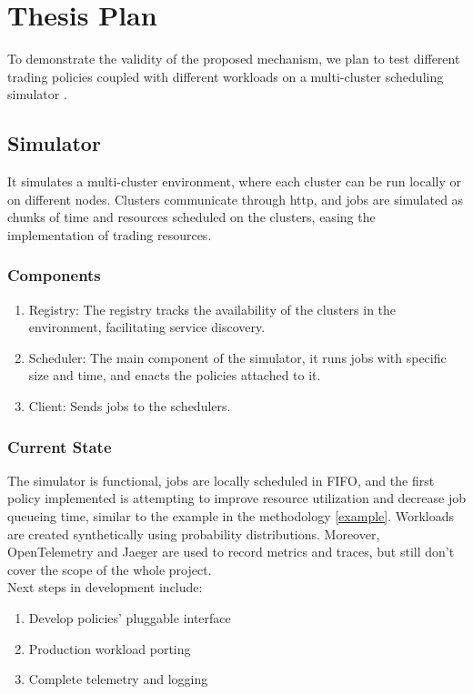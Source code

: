\section{Thesis Plan}

To demonstrate the validity of the proposed mechanism, we plan to test different trading policies 
coupled with different workloads on a multi-cluster scheduling simulator \cite{sched-github}.

\subsection{Simulator}
It simulates a multi-cluster environment, where each cluster can be run locally or on different nodes. 
Clusters communicate through http, and jobs are simulated as chunks of time and resources scheduled on the clusters, 
easing the implementation of trading resources. 

\subsubsection{Components}
\begin{enumerate}
    \item Registry: The registry tracks the availability of the clusters in the environment, facilitating service discovery. 
    \item Scheduler: The main component of the simulator, it runs jobs with specific size and time, and enacts the policies 
    attached to it.
    \item Client: Sends jobs to the schedulers.
\end{enumerate}
\subsubsection{Current State}
The simulator is functional, jobs are locally scheduled in FIFO, and the first policy implemented 
is attempting to improve resource utilization and decrease job queueing time, similar to the example 
in the methodology \ref{example}. Workloads are created synthetically using probability distributions. 
Moreover, OpenTelemetry \cite{opentelemetry} and Jaeger \cite{jaeger} are used to record metrics 
and traces, but still don't cover the scope of the whole project.
\\Next steps in development include:
\begin{enumerate}
    \item Develop policies' pluggable interface
    \item Production workload porting
    \item Complete telemetry and logging
\end{enumerate}
